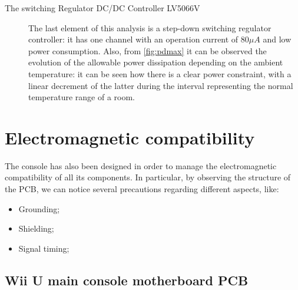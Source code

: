 \documentclass[11pt,a4paper,titlepage]{article}
\begin{document}
\begin{description}
          \item[The switching Regulator DC/DC Controller LV5066V] The last element of this analysis is a step-down switching regulator controller: it has one channel with an operation current of 80$\mu A$ and low power consumption. Also, from \autoref{fig:pdmax} it can be observed the evolution of the allowable power dissipation depending on the ambient temperature: it can be seen how there is a clear power constraint, with a linear decrement of the latter during the interval representing the normal temperature range of a room.

        \end{description}

\section{Electromagnetic compatibility}
  The console has also been designed in order to manage the electromagnetic compatibility of all its components. In particular, by observing the structure of the PCB, we can notice several precautions regarding different aspects, like:
  \begin{itemize}
    \item Grounding;
    \item Shielding;
    \item Signal timing;
  \end{itemize}

  \subsection{Wii U main console motherboard PCB}
\end{document}
